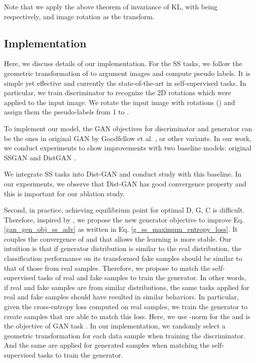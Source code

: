 \documentclass{article}
\begin{document}
Note that we apply the above theorem of invariance of KL, with  being  respectively, and image rotation  as the transform.

\subsection{Implementation}

Here, we discuss  details of our implementation. For the SS tasks, we follow the geometric transformation of \cite{gidaris-iclr-2018} to argument images and compute pseudo labels. It is simple yet effective and currently the state-of-the-art in self-supervised tasks. In particular, we train discriminator to recognize the 2D rotations which were applied to the input image. We rotate the input image with  rotations () and assign them the pseudo-labels from 1 to .

To implement our model, the GAN objectives for discriminator and generator can be the ones in original  GAN by Goodfellow et al. \cite{goodfellow-nisp-2014}, or other variants. In our work, we conduct experiments to show improvements with two baseline models: original SSGAN \cite{chen-arxiv-2018} and DistGAN \cite{tran-eccv-2018}.

We integrate SS tasks into Dist-GAN \cite{tran-eccv-2018} and conduct  study with this baseline. 
In our experiments, we observe that Dist-GAN has good convergence property and  this is important for our ablation study.







Second, in practice, achieving equilibrium point for optimal D, G, C is difficult. Therefore, inspired by \cite{tran-eccv-2018}, we propose the new generator objective to improve Eq. \ref{gan_gen_obj_ss_adv} as written in Eq. \ref{g_ss_maximum_entropy_loss}. It couples the convergence of  and  that allows the learning is more stable. Our intuition is that if generator distribution is similar to the real distribution, the classification performance on its transformed fake samples should be similar to that of those from real samples. Therefore, we propose to match the self-supervised tasks of real and fake samples to train the generator. In other words, if real and fake samples are from similar distributions, the same tasks applied for real and fake samples should have resulted in similar behaviors. In particular, given the cross-entropy loss computed on real samples, we train the generator to create samples that are able to match this loss. Here, we use -norm for the  and  is the objective of GAN task \cite{tran-eccv-2018}. In our implementation, we randomly select a geometric transformation  for each data sample when training the discriminator. And the same  are applied for generated samples when matching the self-supervised tasks to train the generator. 
\end{document}
